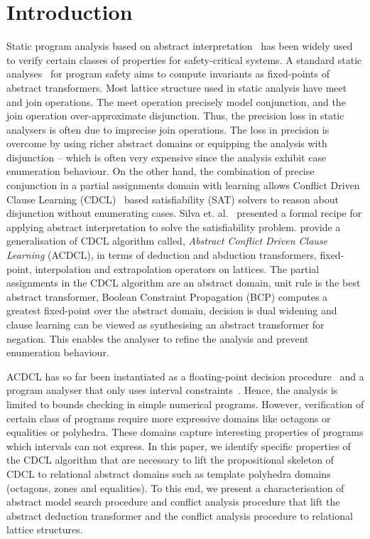 \section{Introduction}
%
Static program analysis based on abstract 
interpretation~\cite{CC77} has been widely used to
verify certain classes of properties for safety-critical systems.  A 
standard static analyses~\cite{se2011} for program safety aims to compute 
invariants as fixed-points of abstract transformers.  Most lattice structure 
used in static analysis have meet and join operations.  The meet operation 
precisely model conjunction, and the join operation over-approximate 
disjunction. Thus, the precision loss in static analysers is often 
due to imprecise join operations. The loss in precision is overcome 
by using richer abstract domains or equipping the analysis with disjunction --
which is often very expensive since the analysis exhibit case enumeration 
behaviour. 
On the other hand, the combination of precise conjunction in a partial
assignments domain with learning allows Conflict Driven Clause
Learning (CDCL)~\cite{cdcl} based satisfiability (SAT) solvers to
reason about disjunction without enumerating cases.  Silva
et. al.~\cite{tacas12, sas12, dhk2013-popl} presented a formal recipe
for applying abstract interpretation to solve the satisfiability
problem.  \cite{dhk2013-popl} provide a generalisation of
CDCL algorithm called, {\em Abstract Conflict Driven Clause Learning}
(ACDCL), in terms of deduction and abduction transformers,
fixed-point, interpolation and extrapolation operators on lattices.
The partial assignments in the CDCL algorithm are an abstract domain,
unit rule is the best abstract transformer, Boolean Constraint
Propagation (BCP) computes a greatest fixed-point over the abstract
domain, decision is dual widening and clause learning can be viewed as
synthesising an abstract transformer for negation.  
This enables the
analyser to refine the analysis and prevent enumeration behaviour.

ACDCL has so far been instantiated as a floating-point decision
procedure~\cite{DBLP:journals/fmsd/BrainDGHK14} and a program analyser
that only uses interval constraints~\cite{tacas12}.  Hence, the
analysis is limited to bounds checking in simple numerical programs.
However, verification of certain class of programs require more
expressive domains like octagons or equalities or polyhedra.  These
domains capture interesting properties of programs which intervals can
not express.  In this paper, we identify specific properties of the
CDCL algorithm that are necessary to lift the propositional skeleton
of CDCL to relational abstract domains such as template polyhedra
domains~\cite{sriram} (octagons, zones and equalities).
To this end, we present a characterisation of abstract model search
procedure and conflict analysis procedure that lift the abstract
deduction transformer and the conflict analysis procedure to
relational lattice structures.
